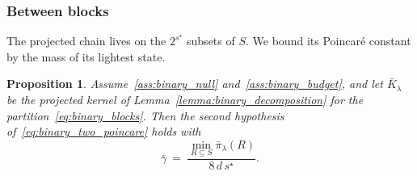 \documentclass[aos]{imsart}%
\theoremstyle{plain}
\newtheorem{proposition}{Proposition}[section]
\theoremstyle{definition}
\begin{document}
    \subsubsection{Between blocks}

    The projected chain lives on the $2^{s^{\star}}$ subsets of $S$. We bound
    its Poincar\'e constant by the mass of its lightest state.

    \begin{proposition}
        \label{prop:binary_across}
        Assume~\ref{ass:binary_null}
        and~\ref{ass:binary_budget}, and let $\bar K_\lambda$ be the projected
        kernel of Lemma~\ref{lemma:binary_decomposition} for the
        partition~\eqref{eq:binary_blocks}. Then the second hypothesis
        of~\eqref{eq:binary_two_poincare} holds with
        \begin{equation}
            \label{eq:binary_across}
            \bar\gamma\ =\ \frac{\min_{R\subseteq S}\bar\pi_\lambda(R)}
            {8\,d\,s^{\star}} .
        \end{equation}
    \end{proposition}
\end{document}
